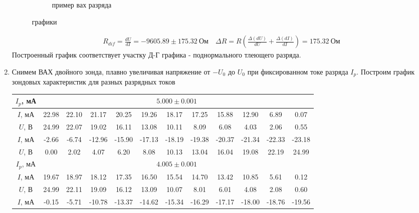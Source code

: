 \documentclass[a4paper, 12pt]{article}
\begin{document}
\begin{enumerate}
\begin{figure}[htbp]
\begin{subfigure}{0.45\textwidth}
            \caption{пример вах разряда}
            \label{пример вах газового разряда}
        \end{subfigure}
        \caption{графики}
        \label{графики}
    \end{figure}
    \begin{align}
        R_{dif} = \frac{dU}{dI} = -9605.89 \pm 175.32\ \text{Ом} \quad \Delta R = R\left(\frac{\Delta(dU)}{dU} + \frac{\Delta(dI)}{dI}\right) = 175.32\ \text{Ом}
    \end{align}
    Построенный график соответствует участку Д-Г графика - поднормального тлеющего разряда.
    \item Снимем ВАХ двойного зонда, плавно увеличивая напряжение от $-U_{0}$ до $U_{0}$ при фиксированном токе разряда $I_{p}$. Построим график зондовых характеристик для разных разрядных токов
    \begin{center}
        \centering
        \begin{tabular}{|c|c|c|c|c|c|c|c|c|c|c|c|}
            \hline
            $I_{p}$, мА & \multicolumn{11}{|c|}{$5.000\pm 0.001$}\\
            \hline
            $I$, мА & 22.98 & 22.10 & 21.17 & 20.25 & 19.26 & 18.17 & 17.25 & 15.88 & 12.90 & 6.89 & 0.07\\
            $U$, В & 24.99 & 22.07 & 19.02 & 16.11 & 13.08 & 10.11 & 8.09 & 6.08 & 4.03 & 2.06 & 0.55\\
            \hline
            $I$, мА & -2.66 & -6.74 & -12.96 & -15.90 & -17.13 & -18.19 & -19.38 & -20.37 & -21.34 & -22.33 & -23.18\\
            $U$, В & 0.00 & 2.02 & 4.07 & 6.20 & 8.08 & 10.13 & 13.04 & 16.04 & 19.08 & 22.19 & 24.99\\
            \hline
            $I_{p}$, мА & \multicolumn{11}{|c|}{$4.005\pm 0.001$}\\
            \hline
            $I$, мА & 19.67 & 18.97 & 18.12 & 17.35 & 16.50 & 15.54 & 14.70 & 13.42 & 10.85 & 5.61 & 0.12\\
            $U$, В & 24.99 & 22.11 & 19.09 & 16.12 & 13.09 & 10.07 & 8.01 & 6.01 & 4.08 & 2.08 & 0.60\\
            \hline
            $I$, мА & -0.15 & -5.71 & -10.78 & -13.37 & -14.62 & -15.34 & -16.29 & -17.17 & -18.00 & -18.76 & -19.56\\

\end{tabular}
\end{center}
\end{enumerate}
\end{document}
